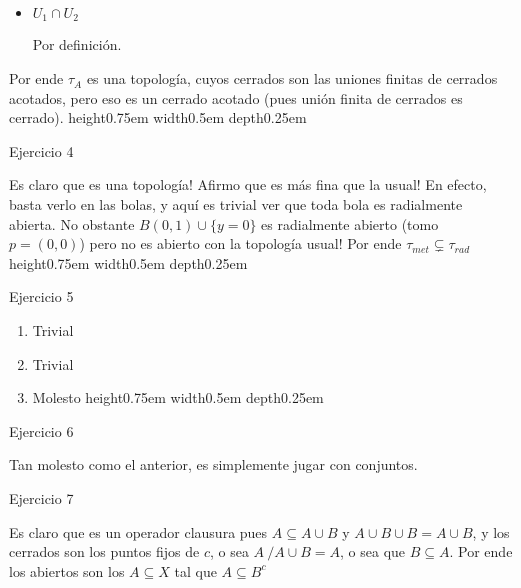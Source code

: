 \documentclass[11pt]{article}
\newcommand{\sett}[1]{\{#1\}}
\newenvironment{proof}[1][Demostraci\'on]{\begin{trivlist}
\item[\hskip \labelsep {\bfseries #1}]}{\end{trivlist}}
\newcommand{\qed}{\nobreak \ifvmode \relax \else
      \ifdim\lastskip<1.5em \hskip-\lastskip
      \hskip1.5em plus0em minus0.5em \fi \nobreak
      \vrule height0.75em width0.5em depth0.25em\fi}
\begin{document}
\begin{enumerate}
\begin{proof}
\begin{itemize}
\item {$U_1 \cap U_2$}

Por definici\'on.

\end{itemize}

Por ende $\tau_A$ es una topolog\'ia, cuyos cerrados son las uniones finitas de cerrados acotados, pero eso es un cerrado acotado (pues uni\'on finita de cerrados es cerrado). \qed

\end{proof}

\item {Ejercicio 4}

\begin{proof}

Es claro que es una topolog\'ia! Afirmo que es m\'as fina que la usual! En efecto, basta verlo en las bolas, y aqu\'i es trivial ver que toda bola es radialmente abierta. No obstante $B(0,1) \cup \sett{y=0}$ es radialmente abierto (tomo $p=(0,0)$) pero no es abierto con la topolog\'ia usual! Por ende $\tau_{met} \subsetneq \tau_{rad}$ \qed

\end{proof}

\item{Ejercicio 5}

\begin{proof}
\begin{enumerate}
\item Trivial
\item Trivial
\item Molesto \qed
\end{enumerate}
\end{proof}

\item {Ejercicio 6}

\begin{proof}
Tan molesto como el anterior, es simplemente jugar con conjuntos.
\end{proof}

\item {Ejercicio 7}

\begin{proof}
Es claro que es un operador clausura pues $A \subseteq A \cup B$ y $A \cup B \cup B = A \cup B$, y los cerrados son los puntos fijos de $c$, o sea $A \ / A\cup B = A$, o sea que $B \subseteq A$. Por ende los abiertos son los $A\subseteq X$ tal que $A \subseteq B^{c}$
\end{proof}


\end{enumerate}
\end{document}
